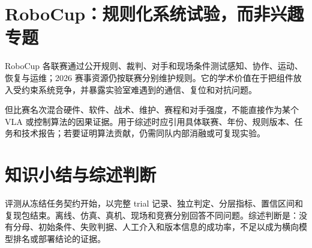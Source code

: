 \section{RoboCup：规则化系统试验，而非兴趣专题}

RoboCup 各联赛通过公开规则、裁判、对手和现场条件测试感知、协作、运动、恢复与运维；2026 赛事资源仍按联赛分别维护规则\cite{robocup2026rules}。它的学术价值在于把组件放入受约束系统竞争，并暴露实验室难遇到的通信、复位和对抗问题。

但比赛名次混合硬件、软件、战术、维护、赛程和对手强度，不能直接作为某个 VLA 或控制算法的因果证据。用于综述时应引用具体联赛、年份、规则版本、任务和技术报告；若要证明算法贡献，仍需同队内部消融或可复现实验。

\section{知识小结与综述判断}

评测从冻结任务契约开始，以完整 trial 记录、独立判定、分层指标、置信区间和复现包结束。离线、仿真、真机、现场和竞赛分别回答不同问题。综述判断是：没有分母、初始条件、失败判据、人工介入和版本信息的成功率，不足以成为横向模型排名或部署结论的证据。

